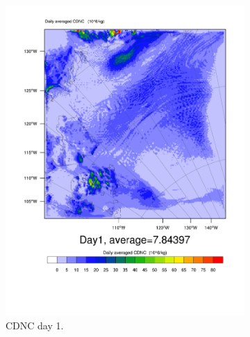 \begin{figure}
	\begin{subfigure}{0.40\textwidth}
		\centering
		\includegraphics[width=\textwidth]{results/control/QNCLOUD_Day1.pdf}
		\caption{CDNC day 1.}
		\label{subfig:cdnc_cont_Day1}
	\end{subfigure}
	\begin{subfigure}{0.40\textwidth}
		\centering

\end{subfigure}
\end{figure}
